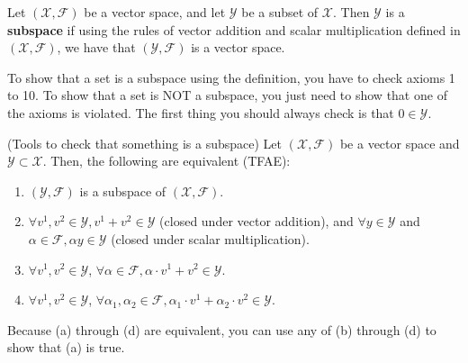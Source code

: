 \begin{definition}
 Let $\left(\mathcal{X},\mathcal{F}\right)$ be a vector space, and let $\mathcal{Y}$ be a subset of $\mathcal{X}$. Then $\mathcal{Y}$ is a \textbf{subspace} if using the rules of vector addition and scalar multiplication defined in $\left(\mathcal{X},\mathcal{F}\right)$, we have that $\left(\mathcal{Y},\mathcal{F}\right)$ is a vector space.
\end{definition}

\begin{rem}
To show that a set is a subspace using the definition, you have to check axioms 1 to 10. To show that a set is NOT a subspace, you just need to show that one of the axioms is violated. The first thing you should always check is that $0 \in \mathcal{Y}$.  
\end{rem} 

\begin{prop}
(Tools to check that something is a subspace)
Let $\left(\mathcal{X},\mathcal{F}\right)$ be a vector space and $\mathcal{Y}\subset\mathcal{X}$.
Then, the following are equivalent (TFAE):
    \begin{enumerate}
        \renewcommand{\labelenumi}{(\alph{enumi})}
        \setlength{\itemsep}{.1cm}
        \item $\left(\mathcal{Y},\mathcal{F}\right)$ is a subspace of $\left(\mathcal{X},\mathcal{F}\right)$.
        
        \item $\forall v^1,v^2\in\mathcal{Y}, v^1+v^2\in\mathcal{Y}$ (closed under vector addition), and $\forall y\in\mathcal{Y}$ and $\alpha\in\mathcal{F},\alpha y\in\mathcal{Y}$ (closed under scalar multiplication).
        
        \item $\forall v^1,v^2\in\mathcal{Y}$, $\forall \alpha\in\mathcal{F}, \alpha\cdot v^1+v^2 \in \mathcal{Y}$.
        
             \item $\forall v^1,v^2\in\mathcal{Y}$, $\forall \alpha_1, \alpha_2 \in\mathcal{F}, \alpha_1 \cdot v^1+ \alpha_2 \cdot v^2 \in \mathcal{Y}$. 
    \end{enumerate}
\end{prop}
\vspace*{.2cm}

Because (a) through (d) are equivalent, you can use any of (b) through (d) to show that (a) is true.\\

